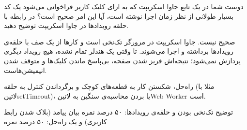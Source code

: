 
دوست شما در یک تابع جاوا اسکریپت که به ازای کلیک کاربر فراخوانی می‌شود یک کد بسیار طولانی از نظر زمان اجرا نوشته است،
آیا این امر صحیح است؟ در رابطه با حلقه رویدادها در جاوا اسکریپت توضیح دهید.


\begin{پاسخ}

صحیح نیست. جاوا اسکریپت در مرورگر تک‌نخی است و کارها از یک صف با حلقه‌ی رویدادها برداشته و اجرا می‌شوند.
تا وقتی یک هندلر تمام نشده، هیچ رویداد دیگری پردازش نمی‌شود؛ نتیجه‌اش فریز شدن صفحه، بی‌پاسخ ماندن کلیک‌ها و متوقف شدن انیمیشن‌هاست.

راه‌حل، شکستن کار به قطعه‌های کوچک و برگرداندن کنترل به حلقه (مثلا با ‌لاتین{setTimeout})،
یا بردن محاسبه‌ی سنگین به ‌لاتین{Web Worker} است.

 توضیح تک‌نخی بودن و حلقه‌ی رویدادها: ۵۰ درصد نمره
 بیان پیامد (بلاک شدن رابط کاربری) و یک راه‌حل: ۵۰ درصد نمره

\end{پاسخ}
